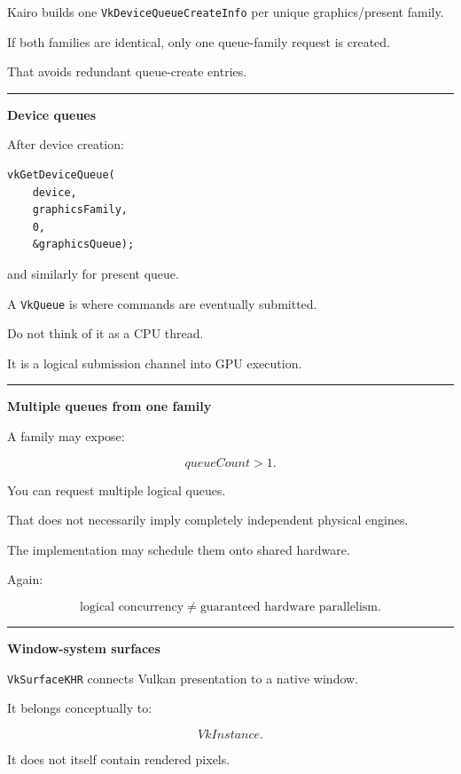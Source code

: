 Kairo builds one \texttt{VkDeviceQueueCreateInfo} per unique graphics/present family.

If both families are identical, only one queue-family request is created.

That avoids redundant queue-create entries.

\begin{center}\rule{0.5\linewidth}{0.5pt}\end{center}

\textbf{Device queues}

After device creation:

\begin{verbatim}
vkGetDeviceQueue(
    device,
    graphicsFamily,
    0,
    &graphicsQueue);
\end{verbatim}

and similarly for present queue.

A \texttt{VkQueue} is where commands are eventually submitted.

Do not think of it as a CPU thread.

It is a logical submission channel into GPU execution.

\begin{center}\rule{0.5\linewidth}{0.5pt}\end{center}

\textbf{Multiple queues from one family}

A family may expose:

\[
queueCount>1.
\]

You can request multiple logical queues.

That does not necessarily imply completely independent physical engines.

The implementation may schedule them onto shared hardware.

Again:

\[
\boxed{
\text{logical concurrency}
\neq
\text{guaranteed hardware parallelism}.
}
\]

\begin{center}\rule{0.5\linewidth}{0.5pt}\end{center}

\textbf{Window-system surfaces}

\texttt{VkSurfaceKHR} connects Vulkan presentation to a native window.

It belongs conceptually to:

\[
VkInstance.
\]

It does not itself contain rendered pixels.

